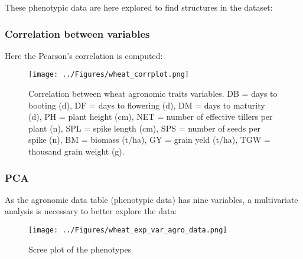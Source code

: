 \documentclass[a4paper,onecolumn,10pt]{article}
\begin{document}
These phenotypic data are here explored to find structures in the dataset:

\subsubsection{Correlation between variables}

Here the Pearson's correlation is computed:
\begin{figure*}
    \centering
    \texttt{[image: ../Figures/wheat\_corrplot.png]}
    \label{fig:wheat_corr}
    \caption{Correlation between wheat agronomic traits variables.
        DB = days to booting (d),
        DF = days to flowering (d),
        DM = days to maturity (d),
        PH = plant height (cm),
        NET = number of effective tillers per plant (n),
        SPL = spike length (cm),
        SPS = number of seeds per spike (n),
        BM = biomass (t/ha),
        GY = grain yeld (t/ha),
        TGW = thousand grain weight (g).}
\end{figure*}

\subsubsection{PCA}

As the agronomic data table (phenotypic data) has nine variables, a multivariate analysis is necessary to better explore the data:

\begin{figure*}
    \centering
    \texttt{[image: ../Figures/wheat\_exp\_var\_agro\_data.png]}
    \label{fig:wheat_}
    \caption{Scree plot of the phenotypes}
\end{figure*}




\end{document}
